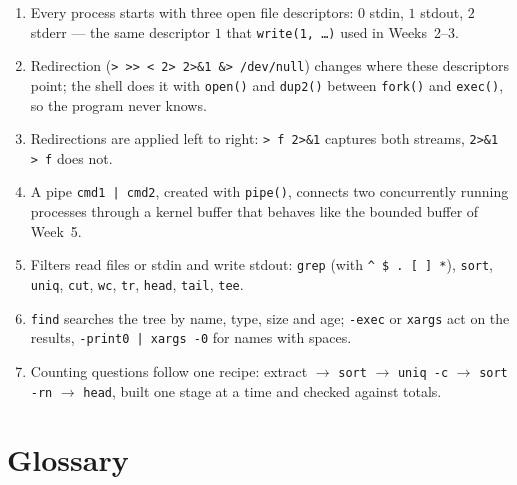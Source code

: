 \documentclass[11pt,a4paper]{article}
\newcommand{\cmd}[1]{\texttt{#1}}
\begin{document}
\begin{keyidea}
\begin{enumerate}[leftmargin=1.4em]
  \item Every process starts with three open file descriptors: $0$ stdin, $1$ stdout, $2$ stderr --- the same descriptor $1$ that \cmd{write(1, \dots)} used in Weeks~2--3.
  \item Redirection (\cmd{> >> < 2> 2>\&1 \&> /dev/null}) changes where these descriptors point; the shell does it with \cmd{open()} and \cmd{dup2()} between \cmd{fork()} and \cmd{exec()}, so the program never knows.
  \item Redirections are applied left to right: \cmd{> f 2>\&1} captures both streams, \cmd{2>\&1 > f} does not.
  \item A pipe \cmd{cmd1 | cmd2}, created with \cmd{pipe()}, connects two concurrently running processes through a kernel buffer that behaves like the bounded buffer of Week~5.
  \item Filters read files or stdin and write stdout: \cmd{grep} (with \texttt{\textasciicircum\ \$ . [ ] *}), \cmd{sort}, \cmd{uniq}, \cmd{cut}, \cmd{wc}, \cmd{tr}, \cmd{head}, \cmd{tail}, \cmd{tee}.
  \item \cmd{find} searches the tree by name, type, size and age; \cmd{-exec} or \cmd{xargs} act on the results, \cmd{-print0 | xargs -0} for names with spaces.
  \item Counting questions follow one recipe: extract $\to$ \cmd{sort} $\to$ \cmd{uniq -c} $\to$ \cmd{sort -rn} $\to$ \cmd{head}, built one stage at a time and checked against totals.
\end{enumerate}
\end{keyidea}

\section{Glossary}
\end{document}
